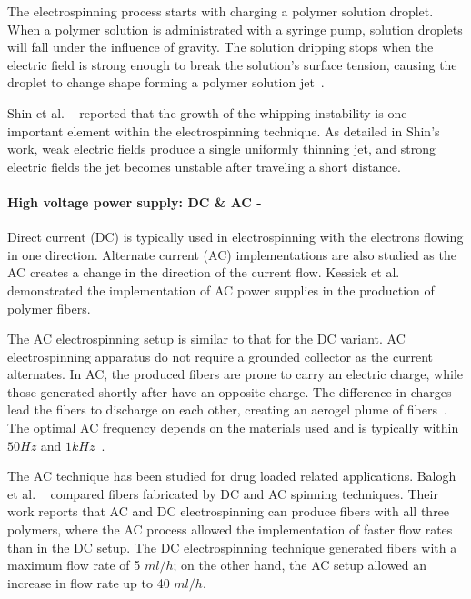 The electrospinning process starts with charging a polymer solution droplet. When a polymer solution is administrated with a syringe pump, solution droplets will fall under the influence of gravity. The solution dripping stops when the electric field is strong enough to break the solution's surface tension, causing the droplet to change shape forming a polymer solution jet\unskip~\cite{527120:12033655}.

Shin et al. \unskip~\cite{527120:13659926} reported that the growth of the whipping instability is one important element within the electrospinning technique. As detailed in Shin's work, weak electric fields produce a single uniformly thinning jet, and strong electric fields the jet becomes unstable after traveling a short distance.



\paragraph{High voltage power supply: DC \& AC - }Direct current (DC) is typically used in electrospinning with the electrons flowing in one direction. Alternate current (AC) implementations are also studied as the AC creates a change in the direction of the current flow. Kessick et al.\unskip~\cite{527120:13444381} demonstrated the implementation of AC power supplies in the production of polymer fibers.

The AC electrospinning setup is similar to that for the DC variant. AC electrospinning apparatus do not require a grounded collector as the current alternates. In AC, the produced fibers are prone to carry an electric charge, while those generated shortly after have an opposite charge. The difference in charges lead the fibers to discharge on each other, creating an aerogel plume of fibers\unskip~\cite{527120:16885570}. The optimal AC frequency depends on the materials used and is typically within  $50Hz $ and  $1kHz $\unskip~\cite{527120:13443405}.

The AC technique has been studied for drug loaded related applications. Balogh et al. \unskip~\cite{527120:13445177} compared fibers fabricated by DC and AC spinning techniques. Their work reports that AC and DC electrospinning can produce fibers with all three polymers, where the AC process allowed the implementation of faster flow rates than in the DC setup. The DC electrospinning technique generated fibers with a maximum flow rate of 5 $ml/h $; on the other hand, the AC setup allowed an increase in flow rate up to 40 $ml/h $.



